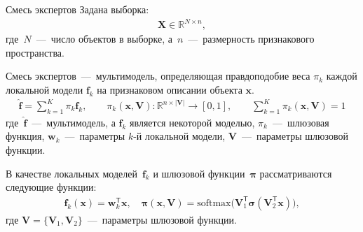 \documentclass[9pt,pdf,hyperref={unicode}]{beamer}
\begin{document}
\begin{frame}{Смесь экспертов}
\justifying
Задана выборка:
\begin{equation*}
\begin{aligned}
\textbf{X} \in \mathbb{R}^{N \times n},
\end{aligned}
\end{equation*}
где~$N$~---~число объектов в выборке, а~$n$~---~размерность признакового пространства.


\begin{definition}
Смесь экспертов~---~мультимодель, определяющая правдоподобие веса $\pi_k$ каждой локальной модели $\textbf{f}_k$ на признаковом описании объекта $\textbf{x}$.
\begin{equation*}
\begin{aligned}
\hat{\mathbf{f}} = \sum_{k=1}^{K}\pi_{k}\mathbf{f}_k, \qquad \pi_{k}\left(\mathbf{x}, \mathbf{V}\right):\mathbb{R}^{n\times \left|\mathbf{V}\right|} \to [0, 1], \qquad \sum_{k=1}^{K}\pi_{k}\left(\mathbf{x}, \mathbf{V}\right) = 1
\end{aligned}
\end{equation*}
где~$\hat{\mathbf{f}}$~---~мультимодель, а $\mathbf{f}_k$ является некоторой моделью, $\pi_k$~---~шлюзовая функция, $\mathbf{w}_k$~---~параметры $k$-й локальной модели, $\mathbf{V}$~---~параметры шлюзовой функции.
\end{definition}

В качестве локальных моделей~$\mathbf{f}_k$ и шлюзовой функции~$\bm{\pi}$ рассматриваются следующие функции:
\begin{equation*}
\begin{aligned}
\mathbf{f}_k\left(\textbf{x}\right) = \textbf{w}_k^{\mathsf{T}}\textbf{x}, \quad
\bm{\pi}\left(\mathbf{x}, \mathbf{V}\right) = \text{softmax}\bigr(\mathbf{V}_{1}^{\mathsf{T}}\bm{\sigma}\left(\mathbf{V}_2^{\mathsf{T}}\mathbf{x}\right)\bigr),
\end{aligned}
\end{equation*}
где $\mathbf{V} = \bigr\{\mathbf{V}_1, \mathbf{V}_2\bigr\}$~---~параметры шлюзовой функции.


\end{frame}
\end{document}
